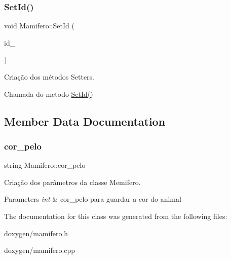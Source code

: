 \subsubsection{\texorpdfstring{Set\+Id()}{SetId()}}
{\footnotesize\ttfamily void Mamifero\+::\+Set\+Id (\begin{DoxyParamCaption}\item[{int}]{id\+\_\+ }\end{DoxyParamCaption})}



Criação dos métodos Setters. 

Chamada do metodo \mbox{\hyperlink{class_mamifero_af4889c9c225884eae0f5da5db0eb9bf3}{Set\+Id()}} 

\subsection{Member Data Documentation}
\mbox{\label{class_mamifero_afa5db00bf6dcf9b2e4e4d24f6d51a36c}} 
\subsubsection{\texorpdfstring{cor\+\_\+pelo}{cor\_pelo}}
{\footnotesize\ttfamily string Mamifero\+::cor\+\_\+pelo\hspace{0.3cm}{\ttfamily [protected]}}



Criação dos parâmetros da classe Memifero. 


\begin{DoxyParams}{Parameters}
{\em int} & cor\+\_\+pelo para guardar a cor do animal \\
\hline
\end{DoxyParams}


The documentation for this class was generated from the following files\+:\begin{DoxyCompactItemize}
\item 
doxygen/mamifero.\+h\item 
doxygen/mamifero.\+cpp\end{DoxyCompactItemize}

